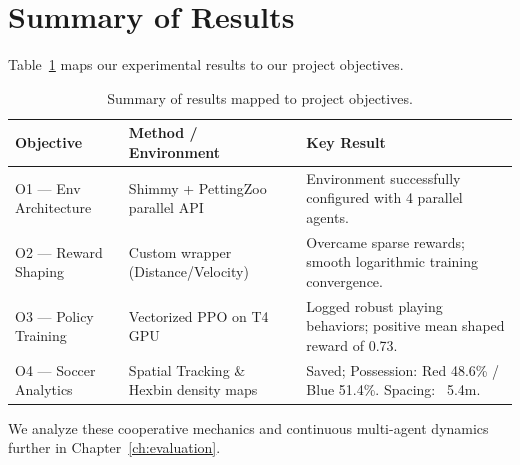 \section{Summary of Results}
\label{sec:results-summary}

Table~\ref{tab:results-summary} maps our experimental results to our project objectives.

\begin{table}[!ht]
    \centering
    \caption{Summary of results mapped to project objectives.}
    \label{tab:results-summary}
    \begin{tabular}{lll}
        \toprule
        \textbf{Objective} & \textbf{Method / Environment} & \textbf{Key Result} \\
        \midrule
        O1 — Env Architecture 
            & Shimmy + PettingZoo parallel API 
            & Environment successfully configured with 4 parallel agents. \\
        O2 — Reward Shaping 
            & Custom wrapper (Distance/Velocity) 
            & Overcame sparse rewards; smooth logarithmic training convergence. \\
        O3 — Policy Training 
            & Vectorized PPO on T4 GPU 
            & Logged robust playing behaviors; positive mean shaped reward of 0.73. \\
        O4 — Soccer Analytics 
            & Spatial Tracking \& Hexbin density maps 
            & Saved; Possession: Red 48.6\% / Blue 51.4\%. Spacing: ~5.4m. \\
        \bottomrule
    \end{tabular}
\end{table}

We analyze these cooperative mechanics and continuous multi-agent dynamics further in Chapter~\ref{ch:evaluation}.
